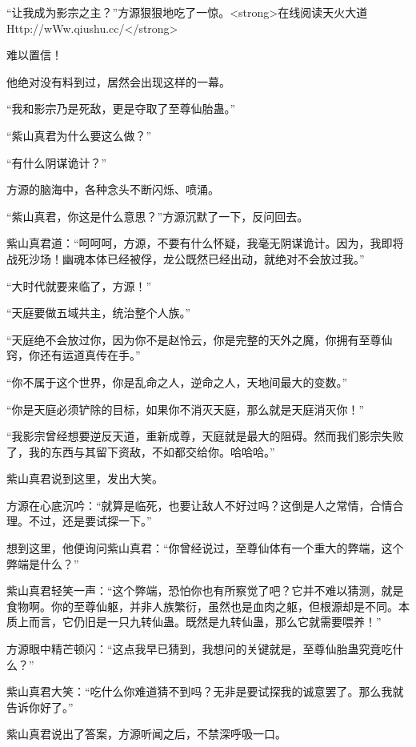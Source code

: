 
\begin{this_body}

“让我成为影宗之主？”方源狠狠地吃了一惊。<strong>在线阅读天火大道Http://wWw.qiushu.cc/</strong>

难以置信！

他绝对没有料到过，居然会出现这样的一幕。

“我和影宗乃是死敌，更是夺取了至尊仙胎蛊。”

“紫山真君为什么要这么做？”

“有什么阴谋诡计？”

方源的脑海中，各种念头不断闪烁、喷涌。

“紫山真君，你这是什么意思？”方源沉默了一下，反问回去。

紫山真君道：“呵呵呵，方源，不要有什么怀疑，我毫无阴谋诡计。因为，我即将战死沙场！幽魂本体已经被俘，龙公既然已经出动，就绝对不会放过我。”

“大时代就要来临了，方源！”

“天庭要做五域共主，统治整个人族。”

“天庭绝不会放过你，因为你不是赵怜云，你是完整的天外之魔，你拥有至尊仙窍，你还有运道真传在手。”

“你不属于这个世界，你是乱命之人，逆命之人，天地间最大的变数。”

“你是天庭必须铲除的目标，如果你不消灭天庭，那么就是天庭消灭你！”

“我影宗曾经想要逆反天道，重新成尊，天庭就是最大的阻碍。然而我们影宗失败了，我的东西与其留下资敌，不如都交给你。哈哈哈。”

紫山真君说到这里，发出大笑。

方源在心底沉吟：“就算是临死，也要让敌人不好过吗？这倒是人之常情，合情合理。不过，还是要试探一下。”

想到这里，他便询问紫山真君：“你曾经说过，至尊仙体有一个重大的弊端，这个弊端是什么？”

紫山真君轻笑一声：“这个弊端，恐怕你也有所察觉了吧？它并不难以猜测，就是食物啊。你的至尊仙躯，并非人族繁衍，虽然也是血肉之躯，但根源却是不同。本质上而言，它仍旧是一只九转仙蛊。既然是九转仙蛊，那么它就需要喂养！”

方源眼中精芒顿闪：“这点我早已猜到，我想问的关键就是，至尊仙胎蛊究竟吃什么？”

紫山真君大笑：“吃什么你难道猜不到吗？无非是要试探我的诚意罢了。那么我就告诉你好了。”

紫山真君说出了答案，方源听闻之后，不禁深呼吸一口。


\end{this_body}
